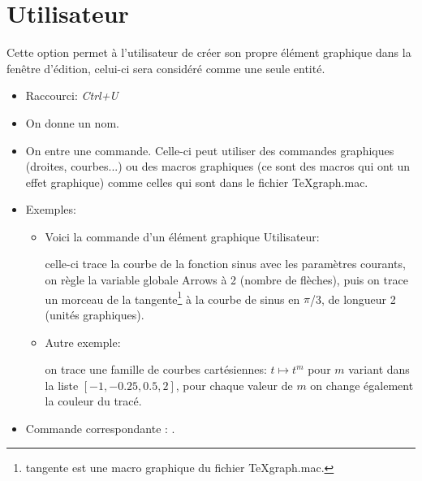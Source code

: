 \section{Utilisateur}

Cette option permet à l'utilisateur de créer son propre élément graphique dans la fenêtre d'édition, celui-ci sera considéré comme une seule entité.

\begin{itemize}
\item Raccourci: \textsl{Ctrl+U}
\item On donne un nom.
\item On entre une commande.  Celle-ci peut utiliser des commandes graphiques (droites, courbes...) ou des macros
graphiques (ce sont des macros qui ont un effet graphique) comme celles qui sont dans le fichier TeXgraph.mac.
\item Exemples:
    \begin{itemize}
    \item Voici la commande d'un élément graphique Utilisateur:

\centerline{\co{[Courbe(t+i*sin(t)), Arrows:=2, tangente(sin(t), pi/3,2)]}}

celle-ci trace la courbe de la fonction sinus avec les paramètres courants, on règle la variable globale Arrows à 2 (nombre de flèches),  puis on trace un morceau de la tangente\footnote{tangente est une macro graphique du fichier TeXgraph.mac.} à la courbe de sinus en $\pi$/3, de longueur 2 (unités graphiques).
    \item Autre exemple:

\centerline{}

on trace une famille de courbes cartésiennes: $t \mapsto t^m$ pour $m$ variant dans la liste $[-1,-0.25,0.5,2]$, pour chaque valeur de $m$ on change également la couleur du tracé.
    \end{itemize}

\item Commande correspondante : .
\end{itemize}
